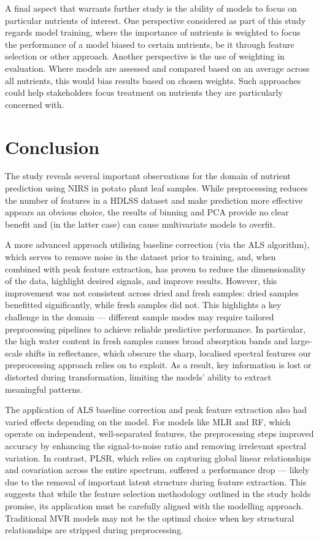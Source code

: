 \documentclass[conference]{IEEEtran}
\begin{document}
A final aspect that warrants further study is the ability of models to focus on particular nutrients of interest. One perspective considered as part of this study regards model training, where the importance of nutrients is weighted to focus the performance of a model biased to certain nutrients, be it through feature selection or other approach. Another perspective is the use of weighting in evaluation. Where models are assessed and compared based on an average across all nutrients, this would bias results based on chosen weights. Such approaches could help stakeholders focus treatment on nutrients they are particularly concerned with.

\section{Conclusion}
The study reveals several important observations for the domain of nutrient prediction using NIRS in potato plant leaf samples. While preprocessing reduces the number of features in a HDLSS dataset and make prediction more effective appears an obvious choice, the results of binning and PCA provide no clear benefit and (in the latter case) can cause multivariate models to overfit.

A more advanced approach utilising baseline correction (via the ALS algorithm), which serves to remove noise in the dataset prior to training, and, when combined with peak feature extraction, has proven to reduce the dimensionality of the data, highlight desired signals, and improve results. However, this improvement was not consistent across dried and fresh samples: dried samples benefitted significantly, while fresh samples did not. This highlights a key challenge in the domain — different sample modes may require tailored preprocessing pipelines to achieve reliable predictive performance. In particular, the high water content in fresh samples causes broad absorption bands and large-scale shifts in reflectance, which obscure the sharp, localised spectral features our preprocessing approach relies on to exploit. As a result, key information is lost or distorted during transformation, limiting the models’ ability to extract meaningful patterns.

The application of ALS baseline correction and peak feature extraction also had varied effects depending on the model. For models like MLR and RF, which operate on independent, well-separated features, the preprocessing steps improved accuracy by enhancing the signal-to-noise ratio and removing irrelevant spectral variation. In contrast, PLSR, which relies on capturing global linear relationships and covariation across the entire spectrum, suffered a performance drop — likely due to the removal of important latent structure during feature extraction. This suggests that while the feature selection methodology outlined in the study holds promise, its application must be carefully aligned with the modelling approach. Traditional MVR models may not be the optimal choice when key structural relationships are stripped during preprocessing.
\end{document}
